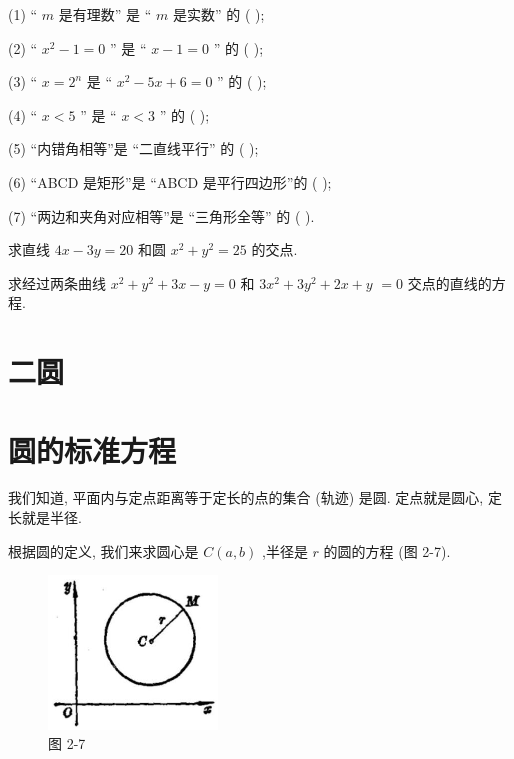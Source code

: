 \documentclass[lang=cn,newtx,10pt,scheme=chinese]{elegantbook}
\begin{document}
\begin{problemset}[习 题 四]
(1) “ \(m\) 是有理数” 是 “ \(m\) 是实数” 的 ( );

(2) “ \({x}^{2} - 1 = 0\) ” 是 “ \(x - 1 = 0\) ” 的 ( );

(3) “ \(x = {2}^{n}\) 是 “ \({x}^{2} - {5x} + 6 = 0\) ” 的 ( );

(4) “ \(x < 5\) ” 是 “ \(x < 3\) ” 的 ( );

(5) “内错角相等”是 “二直线平行” 的 ( );

(6) “ABCD 是矩形”是 “ABCD 是平行四边形”的 ( );

(7) “两边和夹角对应相等”是 “三角形全等” 的 ( ).

\item 求直线 \({4x} - {3y} = {20}\) 和圆 \({x}^{2} + {y}^{2} = {25}\) 的交点.

\item 求经过两条曲线 \({x}^{2} + {y}^{2} + {3x} - y = 0\) 和 \(3{x}^{2} + 3{y}^{2} + {2x} + y\) \(= 0\) 交点的直线的方程.
\end{problemset}

\section*{二\text{ }圆}

\section{圆的标准方程}
\begin{definition}[圆] 
我们知道, 平面内与定点距离等于定长的点的集合 (轨迹) 是圆. 定点就是圆心, 定长就是半径.	
\end{definition}
根据圆的定义, 我们来求圆心是 \(C\left( {a,b}\right)\) ,半径是 \(r\) 的圆的方程 (图 2-7).

\begin{figure}[h]
  \centering
  \includegraphics[max width=0.4\textwidth]{images/01912cc2-ffb6-728e-9ae7-b113ff05c64b_77_682858.jpg}
  \caption{图 2-7}
\end{figure}
\end{document}
